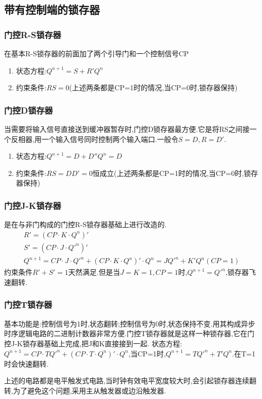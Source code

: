 \documentclass{ctexart}
\begin{document}
\subsection{带有控制端的锁存器}
\subsubsection{门控R-S锁存器}
在基本R-S锁存器的前面加了两个引导门和一个控制信号CP
\begin{enumerate}
    \item 状态方程:$Q^{n+1}=S+R'Q^n$
    \item 约束条件:$RS=0$(上述两条都是CP=1时的情况,当CP=0时,锁存器保持)
\end{enumerate}
\subsubsection{门控D锁存器}
当需要将输入信号直接送到缓冲器暂存时,门控D锁存器最方便.它是将RS之间接一个反相器,用一个输入信号同时控制两个输入端口.一般令$S=D,R=D'$.
\begin{enumerate}
    \item 状态方程:$Q^{n+1}=D+D''Q^n=D$
    \item 约束条件:$RS=DD'=0$恒成立(上述两条都是CP=1时的情况,当CP=0时,锁存器保持)
\end{enumerate}
\subsubsection{门控J-K锁存器}
是在与非门构成的门控R-S锁存器基础上进行改造的.
\begin{align}
    R'=(CP\cdot K \cdot Q^n)'\\
    S'=(CP\cdot J \cdot Q'^n)'\\
    Q^{n+1}=CP\cdot J \cdot Q'^n + (CP\cdot K \cdot Q^n)' \cdot Q^n =JQ'^n+K'Q^n (CP=1)
\end{align}
约束条件$R'+S'=1$天然满足.但是当$J=K=1,CP=1$时,$Q^{n+1}=Q'^n$,锁存器飞速翻转.
\subsubsection{门控T锁存器}
基本功能是:控制信号为1时,状态翻转;控制信号为0时,状态保持不变.用其构成异步时序逻辑电路的二进制计数器非常方便.门控T锁存器就是这样一种锁存器,它在门控J-K锁存器基础上完成,把J和K直接接到一起.
状态方程:$Q^{n+1}=CP \cdot T Q'^n + (CP \cdot T \cdot Q^n)' \cdot Q^n$,当CP=1时,$Q^{n+1}=TQ'^n+T'Q^n$.在T=1时会快速翻转.

上述的电路都是电平触发式电路,当时钟有效电平宽度较大时,会引起锁存器连续翻转,为了避免这个问题,采用主从触发器或边沿触发器.
\end{document}
